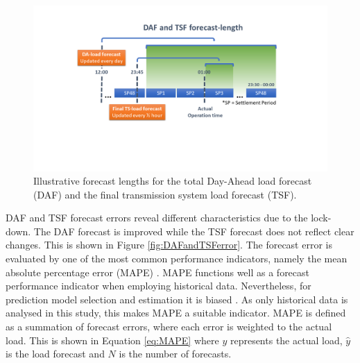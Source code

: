 \documentclass[energies,article,submit,moreauthors,pdftex]{Definitions/mdpi}
\begin{document}
\begin{figure}[H]
\centering
\hspace{-25pt}
\includegraphics[trim={2cm 5cm 2 2cm},clip,width=1.1\textwidth]{Graphics/Forecast explanation.png}
\caption{Illustrative forecast lengths for the total Day-Ahead load forecast (DAF) and the final transmission system load forecast (TSF).}
\label{fig:forecast_length_explanation}
\end{figure} 

DAF and TSF forecast errors reveal different characteristics due to the lock-down. The DAF forecast is improved while the TSF forecast does not reflect clear changes. This is shown in Figure \ref{fig:DAFandTSFerror}. The forecast error is evaluated by one of the most common performance indicators, namely the mean absolute percentage error (MAPE) \cite{SahayDayNetwork, He2020Day-aheadForest}. MAPE functions well as a forecast performance indicator when employing historical data. Nevertheless, for prediction model selection and estimation it is biased \cite{Tofallis2015AEstimation}. As only historical data is analysed in this study, this makes MAPE a suitable indicator.
MAPE is defined as a summation of forecast errors, where each error is weighted to the actual load. This is shown in Equation \ref{eq:MAPE} where $y$ represents the actual load, $\hat{y}$ is the load forecast and $N$ is the number of forecasts.

\end{document}
